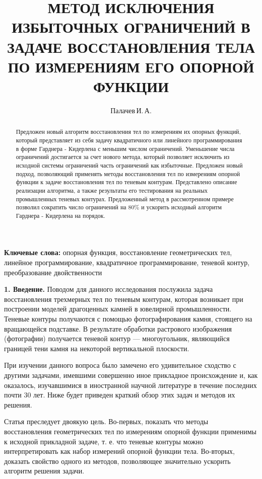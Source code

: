 \documentclass[a4paper, 10pt]{article}
\title{МЕТОД ИСКЛЮЧЕНИЯ ИЗБЫТОЧНЫХ ОГРАНИЧЕНИЙ В ЗАДАЧЕ ВОССТАНОВЛЕНИЯ ТЕЛА ПО 
ИЗМЕРЕНИЯМ ЕГО ОПОРНОЙ ФУНКЦИИ}
\author{Палачев\,И.\,А.}
\theoremstyle{definition}
\theoremstyle{plain}
\theoremstyle{plain}
\begin{document}
\maketitle
\begin{abstract}
Предложен новый алгоритм восстановления тел по измерениям их опорных функций,
который представляет из себя задачу квадратичного или линейного программирования
в форме Гарднера - Кидерлена с меньшим числом ограничений. Уменьшение числа
ограничений достигается за счет нового метода, который позволяет исключить из
исходной системы ограничений часть ограничений как избыточные. Предложен новый
подход, позволяющий применять методы восстановления тел по измерениям опорной
функции к задаче восстановления тел по теневым контурам. Представлено описание
реализации алгоритма, а также результаты его тестирования на реальных
промышленных теневых контурах. Предложенный метод в рассмотренном примере
позволил сократить число ограничений на 80\% и ускорить исходный алгоритм
Гарднера - Кидерлена на порядок.
\end{abstract}

\textbf{Ключевые слова:} опорная функция, восстановление геометрических тел,
линейное программирование, квадратичное программирование, теневой контур,
преобразование двойственности

\textbf{1. Введение.} Поводом для данного исследования послужила задача
восстановления трехмерных тел по теневым контурам, которая возникает при
построении моделей драгоценных камней в ювелирной промышленности. Теневые
контуры получаются с помощью фотографирования камня, стоящего на вращающейся
подставке. В результате обработки растрового изображения (фотографии) получается
теневой контур --- многоугольник, являющийся границей тени камня на некоторой
вертикальной плоскости.

При изучении данного вопроса было замечено его удивительное сходство с другими
задачами, имевшими совершенно иное прикладное происхождение и, как оказалось,
изучавшимися в иностранной научной литературе в течение последних почти 30 лет.
Ниже будет приведен краткий обзор этих задач и методов их решения.

Статья преследует двоякую цель. Во-первых, показать что методы
восстановления геометрических тел по измерениям опорной функции применимы к
исходной прикладной задаче, т. е. что теневые контуры можно интерпретировать
как набор измерений опорной функции тела. Во-вторых, доказать свойство
одного из методов, позволяющее значительно ускорить алгоритм решения задачи.
\end{document}
